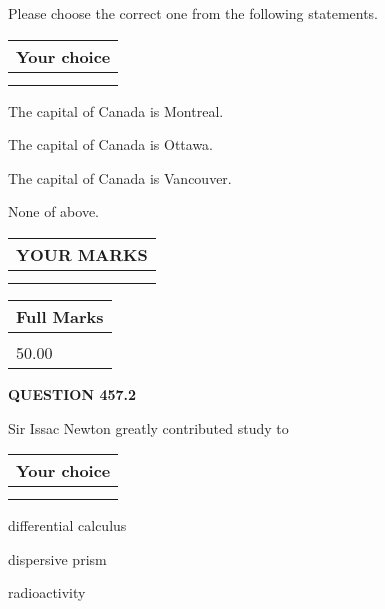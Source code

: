 \documentclass[12pt]{article}
\begin{document}
  
Please choose the correct one from the following statements.
  
  
\noindent\hspace{3.0in} \begin{tabular}{|l|}
\hline
Your choice \\
\hline
 \\ 
 \\ 
\hline
\end{tabular}
  
  
 
 
The capital of Canada is Montreal.
 
 
The capital of Canada is Ottawa.
 
 
The capital of Canada is Vancouver.
 
 
 None of above.
 
 
  
\vspace{0.2in}
  
\noindent\begin{tabular}{|l|}
\hline
 YOUR MARKS  \\
\hline
 \\ 
 \\ 
\hline
\end{tabular}
\hspace{0.05in} \begin{tabular}{|l|}
\hline
 Full Marks  \\
\hline
 \\ 
50.00 \\
\hline
\end{tabular}
{\textbf{\Large{QUESTION
457.2 
}}}
  
  
Sir Issac Newton greatly contributed study to
  
  
\noindent\hspace{3.0in} \begin{tabular}{|l|}
\hline
Your choice \\
\hline
 \\ 
 \\ 
\hline
\end{tabular}
  
  
 
 
differential calculus
 
 
dispersive prism
 
 
radioactivity
 
\end{document}
